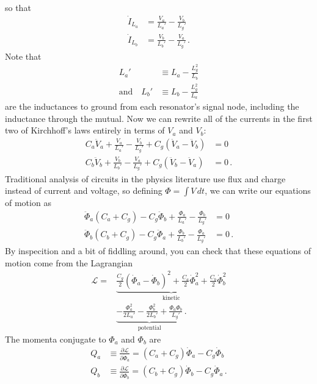 \documentclass{article}
\begin{document}
so that
\begin{align*}
  \dot I_{L_a} &= \frac{V_a}{L_a'} - \frac{V_b}{L_g'} \\
  \dot I_{L_b} &= \frac{V_b}{L_b'} - \frac{V_a}{L_g'} \, .
\end{align*}
Note that
\begin{align*}
  L_a' & \equiv L_a - \frac{L_g^2}{L_b} \\
  \text{and} \quad
  L_b' & \equiv L_b - \frac{L_g^2}{L_a}
\end{align*}
are the inductances to ground from each resonator's signal node, including the inductance through the mutual.
Now we can rewrite all of the currents in the first two of Kirchhoff's laws entirely in terms of $V_a$ and $V_b$:
\begin{align*}
  C_a \ddot V_a + \frac{V_a}{L_a'} - \frac{V_b}{L_g'} + C_g (\ddot V_a - \ddot V_b) &= 0 \\
  C_b \ddot V_b + \frac{V_b}{L_b'} - \frac{V_a}{L_g'} + C_g (\ddot V_b - \ddot V_a) &= 0 \, .
\end{align*}
Traditional analysis of circuits in the physics literature use flux and charge instead of current and voltage, so defining $\Phi = \int V \, dt$, we can write our equations of motion as
\begin{align*}
  \ddot \Phi_a (C_a + C_g) - C_g \ddot \Phi_b + \frac{\Phi_a}{L_a'} - \frac{\Phi_b}{L_g'} &= 0 \\
  \ddot \Phi_b (C_b + C_g) - C_g \ddot \Phi_a + \frac{\Phi_b}{L_b'} - \frac{\Phi_a}{L_g'} &= 0 \, .
\end{align*}
By inspecition and a bit of fiddling around, you can check that these equations of motion come from the Lagrangian
\begin{align}
  \mathcal{L}
  =& \underbrace{\frac{C_g}{2} \left(\dot \Phi_a - \dot \Phi_b \right)^2
   + \frac{C_a}{2} \dot \Phi_a^2 + \frac{C_b}{2} \dot \Phi_b^2}_\text{kinetic} \nonumber \\
  & \underbrace{- \frac{\Phi_a^2}{2 L_a'} - \frac{\Phi_b^2}{2 L_b'} + \frac{\Phi_a \Phi_b}{L_g'}}_\text{potential} \, .
\end{align}
The momenta conjugate to $\Phi_a$ and $\Phi_b$ are
\begin{align*}
  Q_a & \equiv \frac{\partial \mathcal{L}}{\partial \dot \Phi_a} = (C_a + C_g) \dot \Phi_a - C_g \dot \Phi_b \\
  Q_b & \equiv \frac{\partial \mathcal{L}}{\partial \dot \Phi_b} = (C_b + C_g) \dot \Phi_b - C_g \dot \Phi_a
  \, .
\end{align*}
\end{document}
